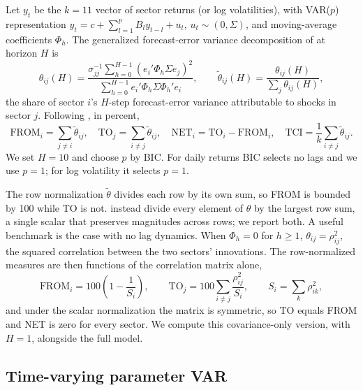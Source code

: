 \documentclass[11pt]{article}
\begin{document}
Let $y_t$ be the $k=11$ vector of sector returns (or log volatilities), with VAR($p$) representation $y_t = c + \sum_{l=1}^{p} B_l y_{t-l} + u_t$, $u_t \sim (0,\Sigma)$, and moving-average coefficients $\Phi_h$. The generalized forecast-error variance decomposition of \citet{pesaran1998} at horizon $H$ is
\begin{equation}
\theta_{ij}(H) = \frac{\sigma_{jj}^{-1}\sum_{h=0}^{H-1}\left(e_i'\Phi_h\Sigma e_j\right)^2}{\sum_{h=0}^{H-1} e_i'\Phi_h\Sigma\Phi_h' e_i},
\qquad \tilde\theta_{ij}(H) = \frac{\theta_{ij}(H)}{\sum_{j}\theta_{ij}(H)},
\end{equation}
the share of sector $i$'s $H$-step forecast-error variance attributable to shocks in sector $j$. Following \citet{diebold2012}, in percent,
\begin{equation}
\text{FROM}_i = \sum_{j\neq i}\tilde\theta_{ij}, \quad \text{TO}_j = \sum_{i\neq j}\tilde\theta_{ij}, \quad \text{NET}_i = \text{TO}_i - \text{FROM}_i, \quad \text{TCI} = \frac{1}{k}\sum_{i\neq j}\tilde\theta_{ij}.
\end{equation}
We set $H=10$ and choose $p$ by BIC. For daily returns BIC selects no lags and we use $p=1$; for log volatility it selects $p=1$.

The row normalization $\tilde\theta$ divides each row by its own sum, so FROM is bounded by 100 while TO is not. \citet{caloia2019} instead divide every element of $\theta$ by the largest row sum, a single scalar that preserves magnitudes across rows; we report both. A useful benchmark is the case with no lag dynamics. When $\Phi_h=0$ for $h\geq 1$, $\theta_{ij} = \rho_{ij}^2$, the squared correlation between the two sectors' innovations. The row-normalized measures are then functions of the correlation matrix alone,
\begin{equation}
\text{FROM}_i = 100\left(1-\frac{1}{S_i}\right), \qquad \text{TO}_j = 100\sum_{i\neq j}\frac{\rho_{ij}^2}{S_i}, \qquad S_i=\sum_{k}\rho_{ik}^2,
\end{equation}
and under the scalar normalization the matrix is symmetric, so TO equals FROM and NET is zero for every sector. We compute this covariance-only version, with $H=1$, alongside the full model.

\subsection{Time-varying parameter VAR}
\end{document}
